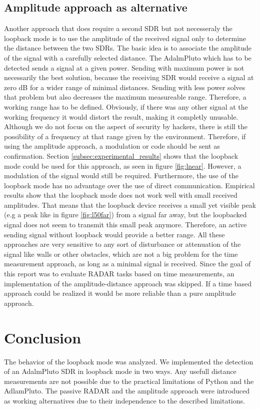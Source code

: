 \documentclass[journal]{IEEEtran}
\begin{document}
\subsection{Amplitude approach as alternative}
\label{sec:Alternatives2}
Another approach that does require a second SDR but not necesseraly the loopback mode is to use the amplitude of the received signal only to determine the distance between the two SDRs.
The basic idea is to associate the amplitude of the signal with a carefully selected distance.
The AdalmPluto which has to be detected sends a signal at a given power. 
Sending with maximum power is not necessarily the best solution, because the receiving SDR would receive a signal at zero dB for a wider range of minimal distances.
Sending with less power solves that problem but also decreases the maximum measureable range.
Therefore, a working range has to be defined.
Obviously, if there was any other signal at the working frequency it would distort the result, making it completly unusable.
Although we do not focus on the aspect of security by hackers, there is still the possibility of a frequency at that range given by the environment.
Therefore, if using the amplitude approach, a modulation or code should be sent as confirmation. 
Section \ref{subsec:experimental_results} shows that the loopback mode could be used for this approach, as seen in figure \ref{fig:lnear}.
However, a modulation of the signal would still be required. 
Furthermore, the use of the loopback mode has no advantage over the use of direct communication.
Empirical results show that the loopback mode does not work well with small received amplitudes.
That means that the loopback device receives a small yet visible peak (e.g a peak like in figure \ref{fig:l50far}) from a signal far away, but the loopbacked signal does not seem to transmit this small peak anymore.
Therefore, an active sending signal without loopback would provide a better range.
All these approaches are very sensitive to any sort of disturbance or attenuation of the signal like walls or other obstacles, which are not a big problem for the time measurement approach, as long as a minimal signal is received.
Since the goal of this report was to evaluate RADAR tasks based on time measurements, an implementation of the amplitude-distance approach was skipped.   
If a time based approach could be realized it would be more reliable than a pure amplitude approach. 


\section{Conclusion}
\label{sec:conclusion}
The behavior of the loopback mode was analyzed.
We implemented the detection of an AdalmPluto SDR in loopback mode in two ways.
Any usefull distance measurements are not possible due to the practical limitations of Python and the AdlamPluto.
The passive RADAR and the amplitude approach were introduced as working alternatives due to their independence to the described limitations. 




\appendices




\end{document}
